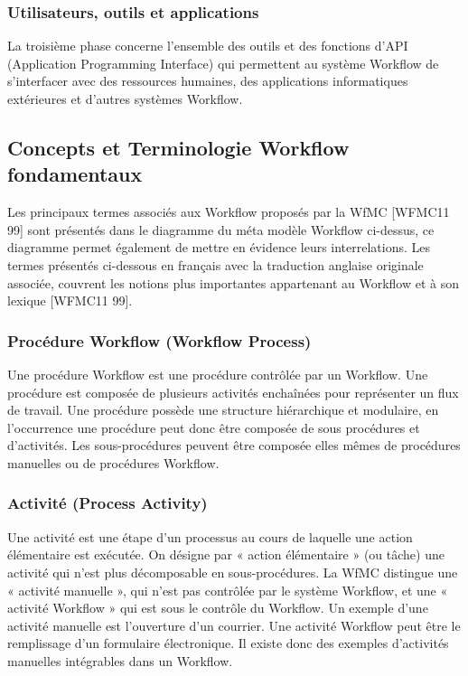  	  	  	 \subsubsection{ Utilisateurs, outils et applications }
 	  	  	 La troisième phase concerne l’ensemble des outils et des fonctions d’API (Application Programming Interface) qui permettent au système Workflow de s’interfacer avec des ressources humaines, des applications informatiques extérieures et d’autres systèmes Workflow. 
 	  	  	 
 	 
 	 
 	 
 
 	 
 	 
 	\subsection{Concepts et Terminologie Workflow fondamentaux } 
 	 
 	 Les principaux termes associés aux Workflow proposés par la WfMC [WFMC11 99] sont présentés dans le diagramme du méta modèle Workflow ci-dessus, ce diagramme permet également de mettre en évidence leurs interrelations. Les termes présentés ci-dessous en français avec la traduction anglaise originale associée, couvrent les notions plus importantes appartenant au Workflow et à son lexique [WFMC11 99]. 
 	 
 	 \subsubsection{Procédure Workflow (Workflow Process) }
 	 
 	 Une procédure Workflow est une procédure contrôlée par un Workflow. Une procédure est composée de plusieurs activités enchaînées pour représenter un flux de travail. Une procédure possède une structure hiérarchique et modulaire, en l’occurrence une procédure peut donc être composée de sous procédures et d’activités. Les sous-procédures peuvent être composée elles mêmes de procédures manuelles ou de procédures Workflow.
 	 
 	 
 	 \subsubsection{Activité (Process Activity) }
 	 Une activité est une étape d’un processus au cours de laquelle une action élémentaire est exécutée. On désigne par « action élémentaire » (ou tâche) une activité qui n’est plus décomposable en sous-procédures. La WfMC distingue une « activité manuelle », qui n’est pas contrôlée par le système Workflow, et une « activité Workflow » qui est sous le contrôle du Workflow. Un exemple d’une activité manuelle est l’ouverture d’un courrier. Une activité Workflow peut être le remplissage d’un formulaire électronique. Il existe donc des exemples d’activités manuelles intégrables dans un Workflow. 
 	 
